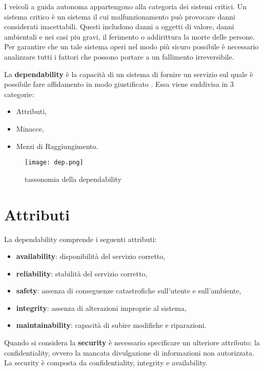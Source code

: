 I veicoli a guida autonoma appartengono alla categoria dei sistemi critici. Un sistema critico è un sistema il cui malfunzionamento può provocare danni
considerati inacettabili. Questi includono danni a oggetti di valore, danni ambientali e nei casi piu gravi, il ferimento o addirittura la morte delle persone.
Per garantire che un tale sistema operi nel modo più sicuro possibile è necessario analizzare tutti i fattori che possono portare a  un fallimento irreversibile.

La \textbf{dependability} è la capacità di un sistema di fornire un servizio sul quale è possibile fare affidamento in modo giustificato \cite{tax}.
Essa viene suddivisa in 3 categorie:
\begin{itemize}
    \item Attributi,
    \item Minacce,
    \item Mezzi di Raggiungimento.
\end{itemize}
\begin{figure}[h]
    \texttt{[image: dep.png]}
    \caption{tassonomia  della dependability\cite{dep}}
    \label{fig:dep}
\end{figure}
\section{Attributi}
La dependability comprende i seguenti attributi:
\begin{itemize}
    \item \textbf{availability}: disponibilità del servizio corretto,
    \item \textbf{reliability}: stabilità del servizio corretto,
    \item \textbf{safety}: assenza di conseguenze catastrofiche sull'utente e sull'ambiente,
    \item \textbf{integrity}: assenza di alterazioni improprie al sistema,
    \item \textbf{maintainability}: capacità di subire modifiche e riparazioni.
\end{itemize}
Quando si considera la \textbf{security} è necessario specificare un ulteriore attributo: la confidentiality, ovvero la mancata divulgazione di informazioni non 
autorizzata. La security è composta da confidentiality, integrity e availability.
